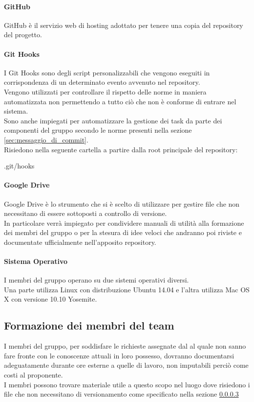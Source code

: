 			\paragraph{GitHub}
			GitHub è il servizio web di hosting adottato per tenere una copia del repository del progetto.
			\paragraph{Git Hooks}
			I Git Hooks sono degli script personalizzabili che vengono eseguiti in corrispondenza di un determinato evento avvenuto nel repository. \\
			Vengono utilizzati per controllare il rispetto delle norme in maniera automatizzata non permettendo a tutto ciò che non è conforme di entrare nel sistema. \\
			Sono anche impiegati per automatizzare la gestione dei task da parte dei componenti del gruppo secondo le norme presenti nella sezione \ref{sec:messaggio_di_commit}. \\
			Risiedono nella seguente cartella a partire dalla root principale del repository:
				\begin{center}
					.git/hooks
				\end{center}
			\paragraph{Google Drive} \label{sec:google_drive}
			Google Drive è lo strumento che si è scelto di utilizzare per gestire file che non necessitano di essere sottoposti a controllo di versione. \\
			In particolare verrà impiegato per condividere manuali di utilità alla formazione dei membri del gruppo o per la stesura di idee veloci che andranno poi riviste e documentate ufficialmente nell'apposito repository.
			\paragraph{Sistema Operativo}
			I membri del gruppo operano su due sistemi operativi diversi. \\
			Una parte utilizza Linux con distribuzione Ubuntu 14.04 e l'altra utilizza Mac OS X con versione 10.10 Yosemite.

	\subsection{Formazione dei membri del team}
	I membri del gruppo, per soddisfare le richieste assegnate dal \roleProjectManager{} al quale non sanno fare fronte con le conoscenze attuali in loro possesso, dovranno documentarsi adeguatamente durante ore esterne a quelle di lavoro, non imputabili perciò come costi al proponente.\\
	I membri possono trovare materiale utile a questo scopo nel luogo dove risiedono i file che non necessitano di versionamento come specificato nella sezione \ref{sec:google_drive}